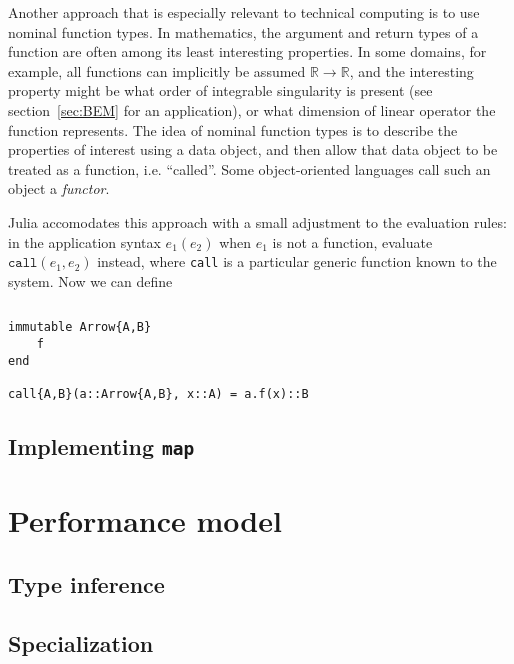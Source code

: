 
Another approach that is especially relevant to technical computing is to use
nominal function types.
In mathematics, the argument and return types of a function are often among its
least interesting properties.
In some domains, for example, all functions can implicitly be assumed
$\mathbb{R}\rightarrow\mathbb{R}$, and the interesting property might be
what order of integrable singularity is present (see section~\ref{sec:BEM} for
an application), or what dimension of linear operator the function represents.
The idea of nominal function types is to describe the properties of interest
using a data object, and then allow that data object to be treated as a
function, i.e. ``called''. Some object-oriented languages call such an object
a \emph{functor}.

Julia accomodates this approach with a small adjustment to the evaluation
rules: in the application syntax $e_1(e_2)$ when $e_1$ is not a function,
evaluate $\texttt{call}(e_1,e_2)$ instead, where \texttt{call} is
a particular generic function known to the system.
Now we can define

\begin{singlespace}
\begin{lstlisting}[style=customjulia]

\end{lstlisting}
\end{singlespace}


\begin{singlespace}
\begin{lstlisting}[style=customjulia]
immutable Arrow{A,B}
    f
end

call{A,B}(a::Arrow{A,B}, x::A) = a.f(x)::B
\end{lstlisting}
\end{singlespace}





\subsection{Implementing \texttt{map}}



\section{Performance model}

\subsection{Type inference}

\subsection{Specialization}

